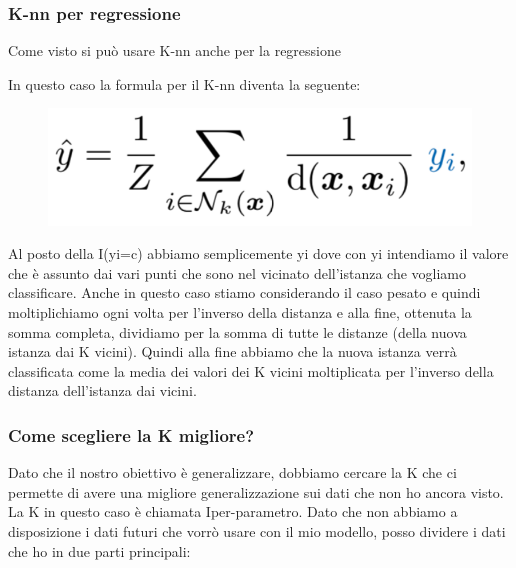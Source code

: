 \documentclass[14pt]{extreport}
\begin{document}
\subsubsection{K-nn per regressione}

Come visto si può usare K-nn anche per la regressione

In questo caso la formula per il K-nn diventa la seguente:


\begin{figure}[H] 
	\centering
	\includegraphics[width=0.7\linewidth]{453.jpeg}
	\end{figure}

	Al posto della I(yi=c) abbiamo semplicemente yi dove con yi intendiamo il valore che è assunto dai vari punti che sono nel vicinato dell’istanza che vogliamo classificare.
	Anche in questo caso stiamo considerando il caso pesato e quindi moltiplichiamo ogni volta per l’inverso della distanza e alla fine, ottenuta la somma completa, dividiamo per la somma di tutte le distanze (della nuova istanza dai K vicini).
	Quindi alla fine abbiamo che la nuova istanza verrà classificata come la media dei valori dei K vicini moltiplicata per l’inverso della distanza dell’istanza dai vicini. 

\subsubsection{Come scegliere la K migliore?} 

Dato che il nostro obiettivo è generalizzare, dobbiamo cercare la K che ci permette di avere una migliore generalizzazione sui dati che non ho ancora visto.
La K in questo caso è chiamata Iper-parametro.
Dato che non abbiamo a disposizione i dati futuri che vorrò usare con il mio modello, posso dividere i dati che ho in due parti principali:
\end{document}
